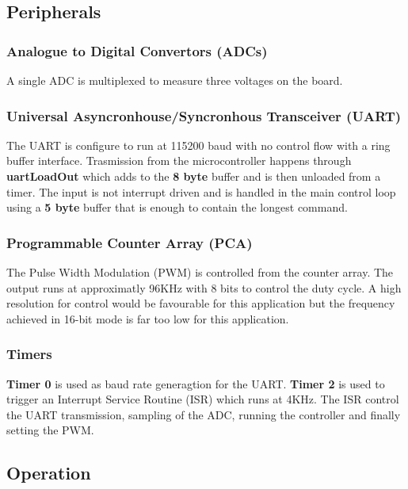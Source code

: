 \documentclass[12pt]{article}%
\begin{document}
\subsection{Peripherals}

\subsubsection{Analogue to Digital Convertors (ADCs)}

A single ADC is multiplexed to measure three voltages on the board. 

\subsubsection{Universal Asyncronhouse/Syncronhous Transceiver (UART)}

The UART is configure to run at 115200 baud with no control flow with a ring buffer interface. Trasmission from the microcontroller happens through \textbf{uartLoadOut} which adds to the \textbf{8 byte} buffer and is then unloaded from a timer. The input is not interrupt driven and is handled in the main control loop using a \textbf{5 byte} buffer that is enough to contain the longest command.

\subsubsection{Programmable Counter Array (PCA)}

The Pulse Width Modulation (PWM) is controlled from the counter array. The output runs at approximatly 96KHz with 8 bits to control the duty cycle. A high resolution for control would be favourable for this application but the frequency achieved in 16-bit mode is far too low for this application.

\subsubsection{Timers}

\textbf{Timer 0} is used as baud rate generagtion for the UART. \textbf{Timer 2} is used to trigger an Interrupt Service Routine (ISR) which runs at 4KHz. The ISR control the UART transmission, sampling of the ADC, running the controller and finally setting the PWM.

\subsection{Operation}
\end{document}
